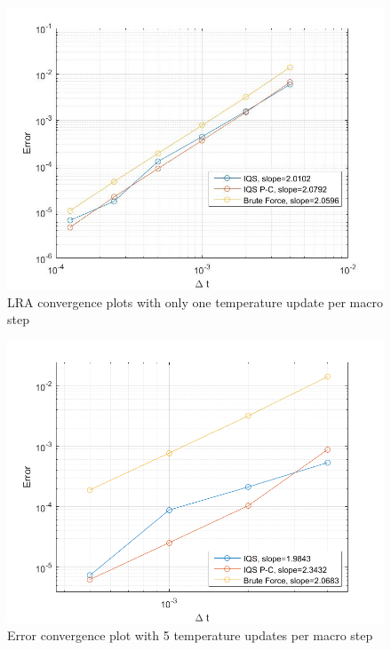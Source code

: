 \documentclass{anstrans}
\begin{document}
\begin{figure}[!htpb]
\centering
\includegraphics[width=\linewidth]{lra_bad.jpg}
\caption{LRA convergence plots with only one temperature update per macro step}
\label{fig:lra_bad}
\end{figure}

\begin{figure}[htbp!]
\centering
\includegraphics[width=\linewidth]{lra_mp_convergence.png}
\caption{Error convergence plot with 5 temperature updates per macro step}
\label{fig:conv}
\end{figure}
\end{document}
